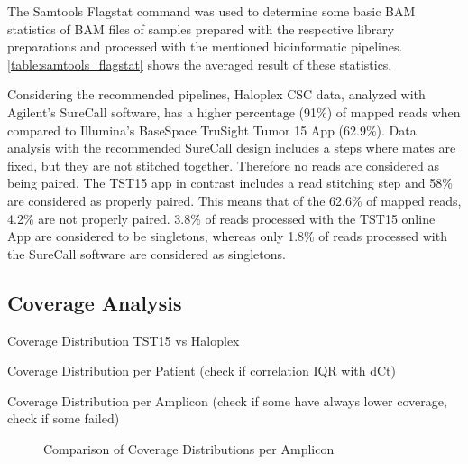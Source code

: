 The Samtools Flagstat command was used to determine some basic BAM statistics of BAM
files of samples prepared with the respective library preparations and processed with
the mentioned bioinformatic pipelines. \ref{table:samtools_flagstat} shows the
averaged result of these statistics.

Considering the recommended pipelines, Haloplex
CSC data, analyzed with Agilent's SureCall software, has a higher percentage (91\%) of mapped
reads when compared to Illumina's BaseSpace TruSight Tumor 15 App (62.9\%). Data analysis
with the recommended SureCall design includes a steps where mates are fixed, but they
are not stitched together. Therefore no reads are considered as being paired. The TST15 app
in contrast includes a read stitching step and 58\% are considered as properly paired.
This means that of the 62.6\% of mapped reads, 4.2\% are not properly paired. 3.8\%
of reads processed with the TST15 online App are considered to be singletons, whereas
only 1.8\% of reads processed with the SureCall software are considered as singletons.

\subsection{Coverage Analysis}

Coverage Distribution TST15 vs Haloplex

Coverage Distribution per Patient (check if correlation IQR with dCt)

Coverage Distribution per Amplicon (check if some have always lower coverage, check if some failed)
\begin{figure}[!tbp]
  \centering
  \hfill
  \caption{Comparison of Coverage Distributions per Amplicon}
\end{figure}


